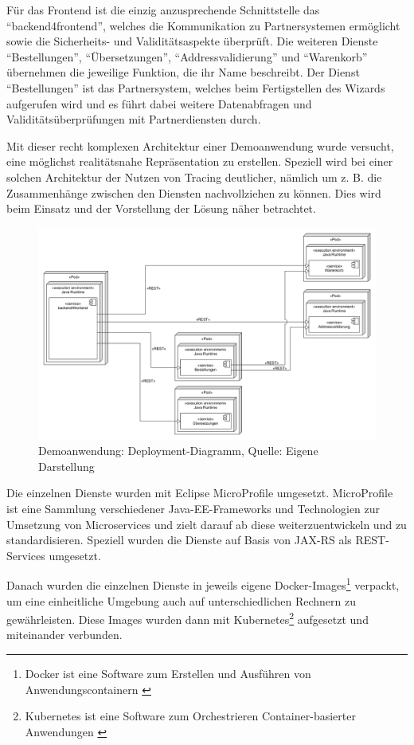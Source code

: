 Für das Frontend ist die einzig anzusprechende Schnittstelle das \enquote{backend4frontend}, welches die Kommunikation zu Partnersystemen ermöglicht sowie die Sicherheits- und Validitätsaspekte überprüft. Die weiteren Dienste \enquote{Bestellungen}, \enquote{Übersetzungen}, \enquote{Addressvalidierung} und \enquote{Warenkorb} übernehmen die jeweilige Funktion, die ihr Name beschreibt. Der Dienst \enquote{Bestellungen} ist das Partnersystem, welches beim Fertigstellen des Wizards aufgerufen wird und es führt dabei weitere Datenabfragen und Validitätsüberprüfungen mit Partnerdiensten durch.

Mit dieser recht komplexen Architektur einer Demoanwendung wurde versucht, eine möglichst realitätsnahe Repräsentation zu erstellen. Speziell wird bei einer solchen Architektur der Nutzen von Tracing deutlicher, nämlich um z. B. die Zusammenhänge zwischen den Diensten nachvollziehen zu können. Dies wird beim Einsatz und der Vorstellung der Lösung näher betrachtet.

\begin{figure}[H]
	\centering
	\includegraphics[width=1.00\linewidth]{img/04_erstellung-poc/demoanwendung_deployment.png}
	\caption{Demoanwendung: Deployment-Diagramm, Quelle: Eigene Darstellung}
	\label{fig:demoanwendung_deployment}
\end{figure}

Die einzelnen Dienste wurden mit Eclipse MicroProfile \cite{EclipseMicroprofile} umgesetzt. MicroProfile ist eine Sammlung verschiedener Java-EE-Frameworks und Technologien zur Umsetzung von Microservices und zielt darauf ab diese weiterzuentwickeln und zu standardisieren. Speziell wurden die Dienste auf Basis von JAX-RS als REST-Services umgesetzt. 

Danach wurden die einzelnen Dienste in jeweils eigene Docker-Images\footnote{Docker \cite{Docker} ist eine Software zum Erstellen und Ausführen von Anwendungscontainern \cite{PatternsForSoftwareOrchestration}} verpackt, um eine einheitliche Umgebung auch auf unterschiedlichen Rechnern zu gewährleisten. Diese Images wurden dann mit Kubernetes\footnote{Kubernetes \cite{Kubernetes} ist eine Software zum Orchestrieren Container-basierter Anwendungen \cite{KeyCharacteristicsOfAContainerOrchestrationPlatform}} aufgesetzt und miteinander verbunden.



